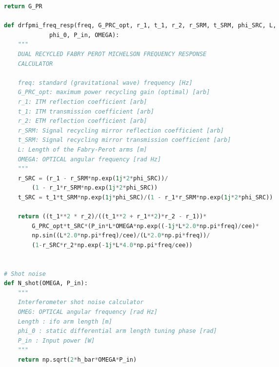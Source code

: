 \begin{spacing}{1}
\begin{lstlisting}[frame=single, language=Python]
    return G_PR

def drfpmi_freq_resp(freq, G_PRC_opt, r_1, t_1, r_2, r_SRM, t_SRM, phi_SRC, L, 
		     phi_0, P_in, OMEGA):
    """
    DUAL RECYCLED FABRY PEROT MICHELSON FREQUENCY RESPONSE 
    CALCULATOR

    freq: standard (gravitational wave) frequency [Hz]
    G_PRC_opt: maximum power recycling gain (optimal) [arb]
    r_1: ITM reflection coefficient [arb]
    t_1: ITM transmission coefficient [arb]
    r_2: ETM reflection coefficient [arb]
    r_SRM: Signal recycling mirror reflection coefficient [arb]
    t_SRM: Signal recycling mirror transmission coefficient [arb]
    L: Length of the Fabry-Perot arms [m]
    OMEGA: OPTICAL angular frequency [rad Hz]
    """
    r_SRC = (r_1 - r_SRM*np.exp(1j*2*phi_SRC))/
	    (1 - r_1*r_SRM*np.exp(1j*2*phi_SRC))
    t_SRC = t_1*t_SRM*np.exp(1j*phi_SRC)/(1 - r_1*r_SRM*np.exp(1j*2*phi_SRC))

    return ((t_1**2 * r_2)/((t_1**2 + r_1**2)*r_2 - r_1))*
	    G_PRC_opt*t_SRC*(P_in*L*OMEGA*np.exp((-1j*L*2.0*np.pi*freq)/cee)*
	    np.sin((L*2.0*np.pi*freq)/cee)/(L*2.0*np.pi*freq))/
	    (1-r_SRC*r_2*np.exp(-1j*L*4.0*np.pi*freq/cee))


# Shot noise
def N_shot(OMEGA, P_in):
    """
    Interferometer shot noise calculator
    OMEG: OPTICAL angular frequency [rad Hz]
    Length : ifo arm length [m]
    phi_0 : static differential arm length tuning phase [rad]
    P_in : Input power [W]
    """
    return np.sqrt(2*h_bar*OMEGA*P_in)
\end{lstlisting}
\end{spacing}
